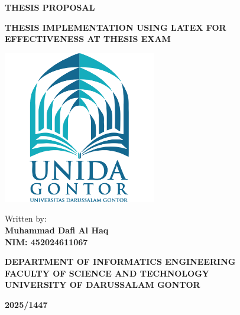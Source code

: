 \begin{titlepage}
	\centering
	\onehalfspacing
	
	{\fontsize{16}{18}\selectfont \textbf{THESIS PROPOSAL}} %
	
	\vspace*{12pt}
	
	{\fontsize{16}{18}\selectfont \textbf{THESIS IMPLEMENTATION USING LATEX FOR EFFECTIVENESS AT THESIS EXAM}} %
	
	\vfill
	
	\includegraphics[width=0.5\textwidth]{assets/logo.png}
	
	\vfill
	
	{\large Written by:\\
		\textbf{Muhammad Dafi Al Haq\\
			NIM: 452024611067}}
	
	\vspace*{2cm}
	
	{\large \textbf{
			DEPARTMENT OF INFORMATICS ENGINEERING\\
			FACULTY OF SCIENCE AND TECHNOLOGY\\
			UNIVERSITY OF DARUSSALAM GONTOR}}\\
	
	\vspace*{0.5cm}
	
	{\large \textbf{2025/1447}}
	
\end{titlepage}